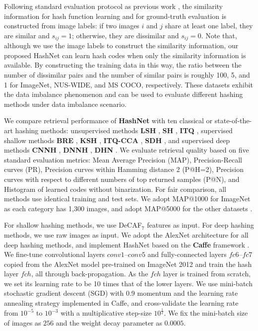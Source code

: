 \documentclass[10pt,twocolumn,letterpaper]{article}
\begin{document}
Following standard evaluation protocol as previous work \cite{cite:AAAI14CNNH,cite:CVPR15DNNH,cite:AAAI16DHN}, the similarity information for hash function learning and for ground-truth evaluation is constructed from image labels: if two images $i$ and $j$ share at least one label, they are similar and  $s_{ij}=1$; otherwise, they are dissimilar and $s_{ij}=0$. Note that, although we use the image labels to construct the similarity information, our proposed HashNet can learn hash codes when only the similarity information is available. By constructing the training data in this way, the ratio between the number of  dissimilar pairs and the number of similar pairs is roughly 100, 5, and 1 for ImageNet, NUS-WIDE, and MS COCO, respectively. These datasets exhibit the data imbalance phenomenon and can be used to evaluate different hashing methods under data imbalance scenario.

We compare retrieval performance of \textbf{HashNet} with ten classical or state-of-the-art hashing methods: unsupervised methods \textbf{LSH} \cite{cite:VLDB99LSH}, \textbf{SH} \cite{cite:NIPS09SH}, \textbf{ITQ} \cite{cite:CVPR11ITQ}, supervised shallow methods \textbf{BRE} \cite{cite:NIPS09BRE}, \textbf{KSH} \cite{cite:CVPR12KSH}, \textbf{ITQ-CCA} \cite{cite:CVPR11ITQ}, \textbf{SDH} \cite{cite:CVPR15SDH}, and supervised deep methods  \textbf{CNNH} \cite{cite:AAAI14CNNH}, \textbf{DNNH} \cite{cite:CVPR15DNNH}, \textbf{DHN} \cite{cite:AAAI16DHN}. %
We evaluate retrieval quality based on five standard evaluation metrics:  Mean Average Precision (MAP), Precision-Recall curves (PR), Precision curves within Hamming distance 2 (P@H=2), Precision curves with respect to different numbers of top returned samples (P@N), and Histogram of learned codes without binarization. For fair comparison, all methods use identical training and test sets. We adopt MAP@1000 for ImageNet as each category has 1,300 images, and adopt MAP@5000 for the other datasets \cite{cite:AAAI16DHN}.
 
For shallow hashing methods, we use DeCAF$_7$ features \cite{cite:ICML14DeCAF} as input. For deep hashing methods, we use raw images as input. We adopt the AlexNet architecture \cite{cite:NIPS12CNN} for all deep hashing methods, and implement HashNet based on the \textbf{Caffe} framework \cite{cite:MM14Caffe}. We fine-tune convolutional layers $conv1$--$conv5$ and fully-connected layers $fc6$--$fc7$ copied from the AlexNet model pre-trained on ImageNet 2012 and train the hash layer $fch$, all through back-propagation. As the $fch$ layer is trained from scratch, we set its learning rate to be 10 times that of the lower layers. We use mini-batch stochastic gradient descent (SGD) with 0.9 momentum and the learning rate annealing strategy implemented in Caffe, and cross-validate the learning rate from $10^{-5}$ to $10^{-3}$ with a multiplicative step-size ${10}^{\frac{1}{2}}$. We fix the mini-batch size of images as $256$ and the weight decay parameter as $0.0005$.
\end{document}
